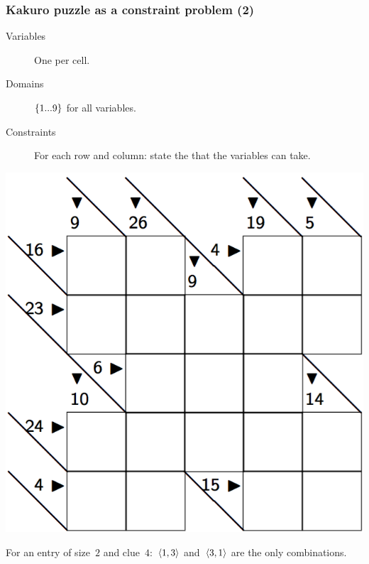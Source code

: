\documentclass{beamer}
\newcommand{\stressed}[1]{\emph{{\color{red!50}{#1}}}}
\begin{document}
\begin{frame}
  \frametitle{Kakuro puzzle as a constraint problem (2)}
  \begin{minipage}{0.6\textwidth}
    \begin{description}
      \item[Variables] One per cell.
      \item[Domains] $\left\{1...9\right\}$ for all variables.
      \item[Constraints] For each row and column: state the \stressed{possible
        combinations of values} that the variables can take.
    \end{description} 
  \end{minipage}
  \begin{minipage}{0.35\textwidth}
    \includegraphics[scale=0.15]{kakuro.png}
  \end{minipage}

  \bigskip
  For an entry of size~$2$ and clue~$4$:~$\left\langle1,3\right\rangle$ and~$\left\langle3,1\right\rangle$
  are the only combinations.
\end{frame}
\end{document}
